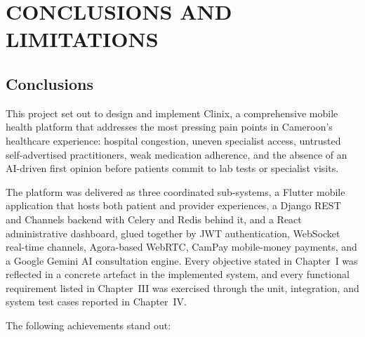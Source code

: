 ﻿%
\chapter{CONCLUSIONS AND LIMITATIONS}

\section{Conclusions}

This project set out to design and implement Clinix, a comprehensive mobile health platform that addresses the most pressing pain points in Cameroon's healthcare experience: hospital congestion, uneven specialist access, untrusted self-advertised practitioners, weak medication adherence, and the absence of an AI-driven first opinion before patients commit to lab tests or specialist visits.

The platform was delivered as three coordinated sub-systems, a Flutter mobile application that hosts both patient and provider experiences, a Django REST and Channels backend with Celery and Redis behind it, and a React administrative dashboard, glued together by JWT authentication, WebSocket real-time channels, Agora-based WebRTC, CamPay mobile-money payments, and a Google Gemini AI consultation engine. Every objective stated in Chapter~I was reflected in a concrete artefact in the implemented system, and every functional requirement listed in Chapter~III was exercised through the unit, integration, and system test cases reported in Chapter~IV.

The following achievements stand out:

